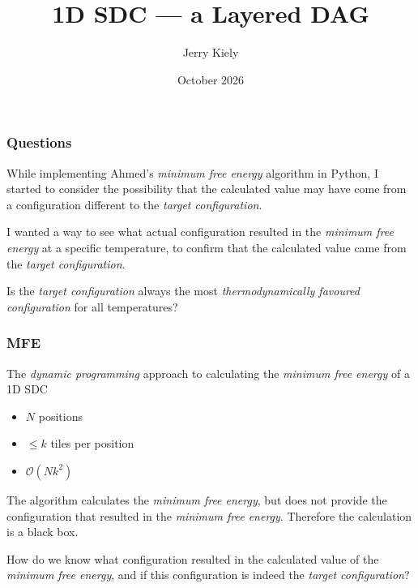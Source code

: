 \documentclass[aspectratio=1610]{beamer}
\title{1D SDC --- a Layered DAG}
\author{Jerry Kiely}
\date{October 2026}
\begin{document}
\begin{frame}
\titlepage{}
\end{frame}




\begin{frame}
\frametitle{Questions}
While implementing Ahmed's \textit{minimum free energy} algorithm in
Python, I started to consider the possibility that the calculated value
may have come from a configuration different to the
\textit{target configuration}.
\newline

I wanted a way to see what actual configuration resulted in the
\textit{minimum free energy} at a specific temperature, to confirm
that the calculated value came from the \textit{target configuration}.
\newline

Is the \textit{target configuration} always the most
\textit{thermodynamically favoured configuration} for all
temperatures?
\end{frame}




\begin{frame}
\frametitle{MFE}
The \textit{dynamic programming} approach to calculating the
\textit{minimum free energy} of a 1D SDC
\newline

\begin{itemize}
    \item \(N\) positions
    \item \(\leq k\) tiles per position
    \item \(\mathcal{O}(Nk^2)\)
\end{itemize}
\hfill \break{}

The algorithm calculates the \textit{minimum free energy}, but does not
provide the configuration that resulted in the \textit{minimum free energy}.
Therefore the calculation is a black box.
\newline

How do we know what configuration resulted in the calculated value of
the \textit{minimum free energy}, and if this configuration is indeed
the \textit{target configuration}?
\end{frame}
\end{document}
